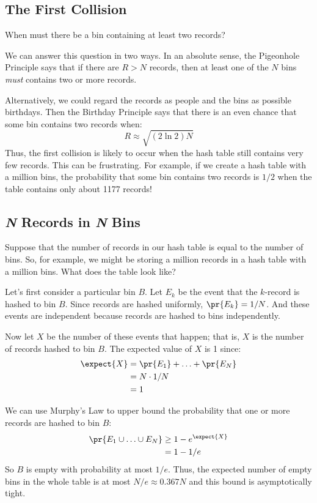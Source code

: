 \begin{editingnotes}
\subsection{The First Collision}

When must there be a bin containing at least two records?

We can answer this question in two ways.  In an absolute sense, the
Pigeonhole Principle says that if there are $R > N$ records, then at
least one of the $N$ bins \textit{must} contains two or more records.

Alternatively, we could regard the records as people and the bins as
possible birthdays.  Then the Birthday Principle says that there is an
even chance that some bin contains two records when:
%
\[
R \approx \sqrt{(2 \ln 2) N}
\]
%
Thus, the first collision is likely to occur when the hash table still
contains very few records.  This can be frustrating.  For example, if
we create a hash table with a million bins, the probability that some
bin contains two records is $1/2$ when the table contains only about
1177 records!

\subsection{\emph{N} Records in \emph{N} Bins}

Suppose that the number of records in our hash table is equal to the
number of bins.  So, for example, we might be storing a million
records in a hash table with a million bins.  What does the table look
like?

Let's first consider a particular bin $B$.  Let $E_k$ be the event
that the $k$-record is hashed to bin $B$.  Since records are hashed
uniformly, $\pr{E_k} = 1/N$.  And these events are independent because
records are hashed to bins independently.

Now let $X$ be the number of these events that happen; that is, $X$ is
the number of records hashed to bin $B$.  The expected value of $X$ is
1 since:
%
\begin{align*}
\expect{X}
    & = \pr{E_1} + \ldots + \pr{E_N} \\
    & = N \cdot 1 / N \\
    & = 1
\end{align*}

We can use Murphy's Law to upper bound the probability that one or
more records are hashed to bin $B$:
%
\begin{align*}
\pr{E_1 \cup \ldots \cup E_N}
    & \geq 1 - e^{\expect{X}} \\
    & = 1 - 1 / e
\end{align*}
%
So $B$ is empty with probability at most $1 / e$.  Thus, the expected
number of empty bins in the whole table is at most $N / e \approx
0.367N$ and this bound is asymptotically tight.


\end{editingnotes}
